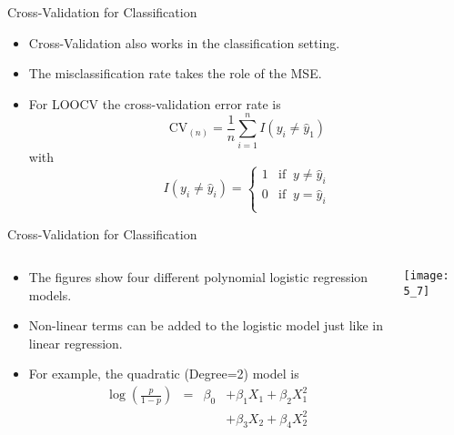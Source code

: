 \documentclass[mathserif, aspectratio=169]{beamer}
\begin{document}
\begin{frame}{Cross-Validation for Classification}
	\begin{itemize}
		\item Cross-Validation also works in the classification setting.
		\item The misclassification rate takes the role of the MSE.
		\item For LOOCV the cross-validation error rate is
			\[ 
				\text{CV}_{(n)} = \frac{1}{n} \sum_{i=1}^n I(y_i\ne \hat{y}_1)
			\]
			with
			\[
				I(y_i\ne \hat{y}_i) =
				\begin{cases}
					1 & \text{if}\;\; y\ne \hat{y}_i\\
					0 & \text{if}\;\; y = \hat{y}_i\\
				\end{cases}
			\]
	\end{itemize}
\end{frame}

\begin{frame}{Cross-Validation for Classification}
	\begin{columns}
		\begin{column}{0.5\textwidth}
			\begin{itemize}
				\item The figures show four different polynomial
					logistic regression models.
				\item Non-linear terms can be added to the logistic model just like
					in linear regression.
				\item For example, the quadratic (Degree=2) model is
					\begin{align*}
						\log\left(\frac{p}{1-p}\right) & =
						&\beta_0&+ \beta_1 X_1 + \beta_2 X_1^2\\
						&\phantom{=} &\phantom{\beta_0}&+ \beta_3 X_2 + \beta_4 X_2^2\\
					\end{align*}
			\end{itemize}
		\end{column}
		\begin{column}{0.5\textwidth}
			\vspace{-10mm}
			\begin{center}
				\texttt{[image: 5\_7]}
			\end{center}
		\end{column}
	\end{columns}
\end{frame}
\end{document}
